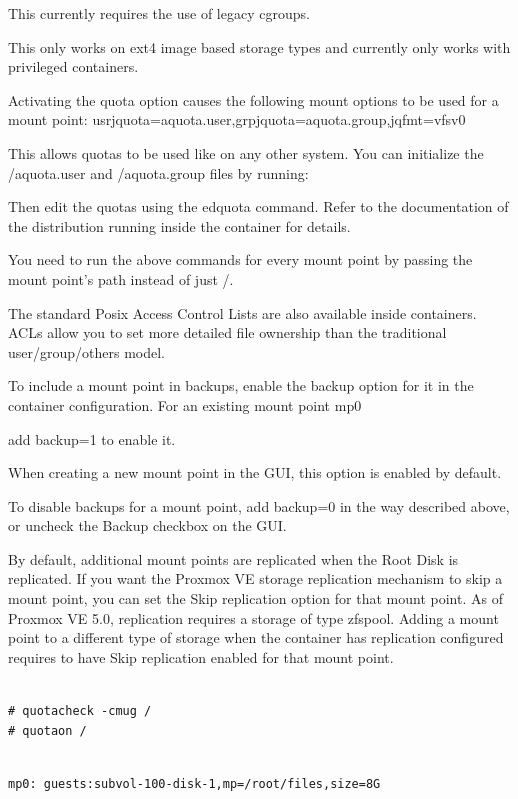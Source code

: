 This currently requires the use of legacy cgroups.

This only works on ext4 image based storage types and currently only works with privileged containers.

Activating the quota option causes the following mount options to be used for a mount point: usrjquota=aquota.user,grpjquota=aquota.group,jqfmt=vfsv0

This allows quotas to be used like on any other system. You can initialize the /aquota.user and /aquota.group files by running:

Then edit the quotas using the edquota command. Refer to the documentation of the distribution running inside the container for details.

You need to run the above commands for every mount point by passing the mount point’s path instead of just /.

The standard Posix Access Control Lists are also available inside containers. ACLs allow you to set more detailed file ownership than the traditional user/group/others model.

To include a mount point in backups, enable the backup option for it in the container configuration. For an existing mount point mp0

add backup=1 to enable it.

When creating a new mount point in the GUI, this option is enabled by default.

To disable backups for a mount point, add backup=0 in the way described above, or uncheck the Backup checkbox on the GUI.

By default, additional mount points are replicated when the Root Disk is replicated. If you want the Proxmox VE storage replication mechanism to skip a mount point, you can set the Skip replication option for that mount point. As of Proxmox VE 5.0, replication requires a storage of type zfspool. Adding a mount point to a different type of storage when the container has replication configured requires to have Skip replication enabled for that mount point.

\begin{lstlisting}

# quotacheck -cmug /
# quotaon /

\end{lstlisting}

\begin{lstlisting}

mp0: guests:subvol-100-disk-1,mp=/root/files,size=8G

\end{lstlisting}

